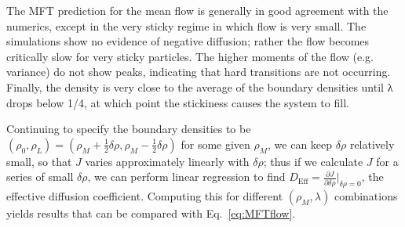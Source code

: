 \documentclass[
reprint,
 amsmath,amssymb,
 aps,
 prl,
]{revtex4-1}
\newcommand{\partDeriv}[2]{\frac{\partial #1}{\partial #2}}
\begin{document}
\begin{figure}[h!]
\begin{center}
\begin{tabular}{c}
    \end{tabular}
\end{center}
    \vspace{-2.5em}
\end{figure}
The MFT prediction for the mean flow is generally in good agreement with the numerics, except in the very sticky regime in which flow is very small.
The simulations show no evidence of negative diffusion; rather the flow becomes critically slow for very sticky particles.
The higher moments of the flow (e.g. variance) do not show peaks, indicating that hard transitions are not occurring.
Finally, the density is very close to the average of the boundary densities until λ drops below 1/4, at which point the stickiness causes the system to fill.

Continuing to specify the boundary densities to be $(\rho_0, \rho_L) = (\rho_M + \frac{1}{2} \delta\rho, \rho_M - \frac{1}{2} \delta\rho)$ for some given $\rho_M$, we can keep $\delta\rho$ relatively small, so that $J$ varies approximately
linearly with $\delta\rho$; thus if we calculate $J$ for a series of small $\delta \rho$, we can perform linear regression to find $D_\mathrm{Eff}=\partDeriv{J}{\delta\rho}\big|_{\delta\rho=0}$, the effective diffusion coefficient.
Computing this for different $(\rho_M, \lambda)$ combinations yields results that can be compared with Eq.~\ref{eq:MFTflow}.
\end{document}

